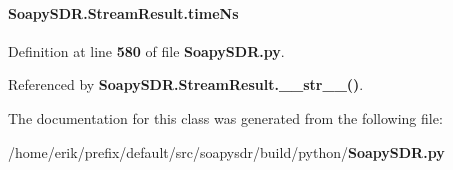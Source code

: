 \paragraph[{time\+Ns}]{\setlength{\rightskip}{0pt plus 5cm}Soapy\+S\+D\+R.\+Stream\+Result.\+time\+Ns\hspace{0.3cm}{\ttfamily [static]}}\label{classSoapySDR_1_1StreamResult_a9be4f489314114d85be907f3df6c58c4}


Definition at line {\bf 580} of file {\bf Soapy\+S\+D\+R.\+py}.



Referenced by {\bf Soapy\+S\+D\+R.\+Stream\+Result.\+\_\+\+\_\+str\+\_\+\+\_\+()}.



The documentation for this class was generated from the following file\+:\begin{DoxyCompactItemize}
\item 
/home/erik/prefix/default/src/soapysdr/build/python/{\bf Soapy\+S\+D\+R.\+py}\end{DoxyCompactItemize}
